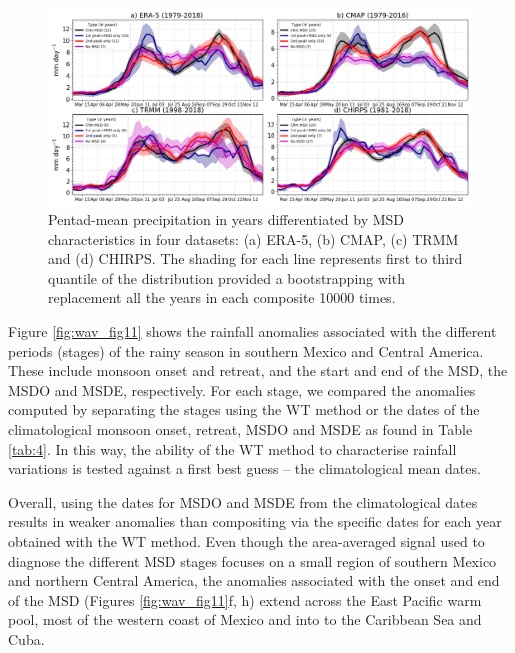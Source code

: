 \begin{figure}[t!]
 \noindent\includegraphics[width=\linewidth]{figures/wav_fig5c.png}
\caption[Seasonal cycle of precipitation for various MSD categories]{ Pentad-mean precipitation in years differentiated by MSD characteristics in four datasets: (a) ERA-5, (b) CMAP, (c) TRMM and (d) CHIRPS. The shading for each line represents first to third quantile of the distribution provided a bootstrapping with replacement all the years in each composite 10000 times.  }
\label{fig:S2}
\end{figure}

Figure \ref{fig:wav_fig11} shows the rainfall anomalies associated with the different periods (stages) of the rainy season in southern Mexico and Central America. These include monsoon onset and retreat, and the start and end of the MSD, the MSDO and MSDE, respectively. For each stage, we compared the anomalies computed by separating the stages using the WT method or the dates of the climatological monsoon onset, retreat, MSDO and MSDE as found in Table \ref{tab:4}. In this way, the ability of the WT method to characterise rainfall variations is tested against a first best guess -- the climatological mean dates. 

Overall, using the dates for MSDO and MSDE from the climatological dates results in weaker anomalies than compositing via the specific dates for each year obtained with the WT method.  Even though the area-averaged signal used to diagnose the different MSD stages focuses on a small region of southern Mexico and northern Central America, the anomalies associated with the onset and end of the MSD (Figures \ref{fig:wav_fig11}f, h) extend across the East Pacific warm pool, most of the western coast of Mexico and into to the Caribbean Sea and Cuba. 

